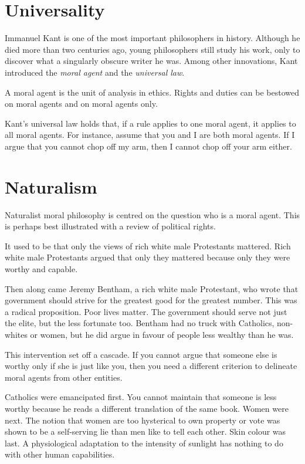 \section{Universality}
Immanuel Kant is one of the most important philosophers in history. Although he died more than two centuries ago, young philosophers still study his work, only to discover what a singularly obscure writer he was. Among other innovations, Kant introduced the \emph{moral agent} and the \emph{universal law}.

A moral agent is the unit of analysis in ethics. Rights and duties can be bestowed on moral agents and on moral agents only.

Kant's universal law holds that, if a rule applies to one moral agent, it applies to all moral agents. For instance, assume that you and I are both moral agents. If I argue that you cannot chop off my arm, then I cannot chop off your arm either.

\section{Naturalism}
Naturalist moral philosophy is centred on the question who is a moral agent. This is perhaps best illustrated with a review of political rights.

It used to be that only the views of rich white male Protestants mattered. Rich white male Protestants argued that only they mattered because only they were worthy and capable.

Then along came Jeremy Bentham, a rich white male Protestant, who wrote that government should strive for the greatest good for the greatest number. This was a radical proposition. Poor lives matter. The government should serve not just the elite, but the less fortunate too. Bentham had no truck with Catholics, non-whites or women, but he did argue in favour of people less wealthy than he was.

This intervention set off a cascade. If you cannot argue that someone else is worthy only if she is just like you, then you need a different criterion to delineate moral agents from other entities.

Catholics were emancipated first. You cannot maintain that someone is less worthy because he reads a different translation of the same book. Women were next. The notion that women are too hysterical to own property or vote was shown to be a self-serving lie than men like to tell each other. Skin colour was last. A physiological adaptation to the intensity of sunlight has nothing to do with other human capabilities.

